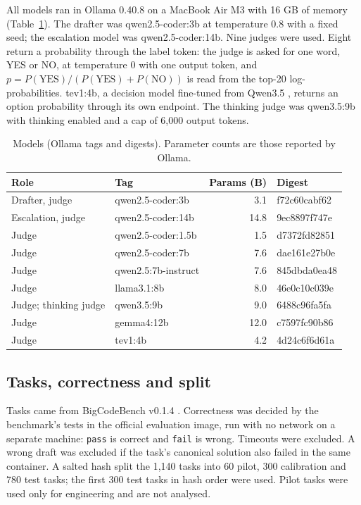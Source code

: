 \documentclass[smallextended]{svjour3}
\begin{document}
All models ran in Ollama 0.40.8 on a MacBook Air M3 with 16 GB of memory (Table~\ref{tab:models}). The drafter was qwen2.5-coder:3b \citep{hui2024qwen} at temperature 0.8 with a fixed seed; the escalation model was qwen2.5-coder:14b. Nine judges were used. Eight return a probability through the label token: the judge is asked for one word, YES or NO, at temperature 0 with one output token, and $p = P(\text{YES})/(P(\text{YES})+P(\text{NO}))$ is read from the top-20 log-probabilities. tev1:4b, a decision model fine-tuned from Qwen3.5 \citep{ollamatev1}, returns an option probability through its own endpoint. The thinking judge was qwen3.5:9b with thinking enabled and a cap of 6,000 output tokens.

\begin{table}[t]
\caption{Models (Ollama tags and digests). Parameter counts are those reported by Ollama.}\label{tab:models}
\centering\small
\begin{tabular}{llrl}
\toprule
Role & Tag & Params (B) & Digest \\
\midrule
Drafter, judge & qwen2.5-coder:3b & 3.1 & f72c60cabf62 \\
Escalation, judge & qwen2.5-coder:14b & 14.8 & 9ec8897f747e \\
Judge & qwen2.5-coder:1.5b & 1.5 & d7372fd82851 \\
Judge & qwen2.5-coder:7b & 7.6 & dae161e27b0e \\
Judge & qwen2.5:7b-instruct & 7.6 & 845dbda0ea48 \\
Judge & llama3.1:8b & 8.0 & 46e0c10c039e \\
Judge; thinking judge & qwen3.5:9b & 9.0 & 6488c96fa5fa \\
Judge & gemma4:12b & 12.0 & c7597fc90b86 \\
Judge & tev1:4b & 4.2 & 4d24c6f6d61a \\
\bottomrule
\end{tabular}
\end{table}

\subsection{Tasks, correctness and split}

Tasks came from BigCodeBench v0.1.4 \citep{zhuo2024bigcodebench}. Correctness was decided by the benchmark's tests in the official evaluation image, run with no network on a separate machine: \texttt{pass} is correct and \texttt{fail} is wrong. Timeouts were excluded. A wrong draft was excluded if the task's canonical solution also failed in the same container. A salted hash split the 1,140 tasks into 60 pilot, 300 calibration and 780 test tasks; the first 300 test tasks in hash order were used. Pilot tasks were used only for engineering and are not analysed.
\end{document}
